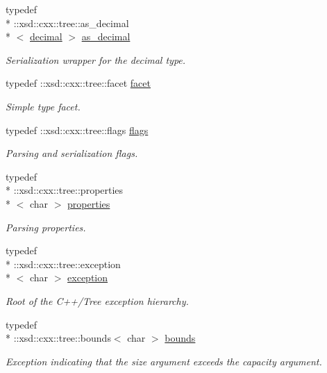 \begin{DoxyCompactItemize}
typedef \\*
\-::xsd\-::cxx\-::tree\-::as\-\_\-decimal\\*
$<$ \hyperlink{namespacexml__schema_a69bfaf24f63a8c18ebd8e21db6b343df}{decimal} $>$ \hyperlink{namespacexml__schema_a60dfdca63dedf12d8a524c0496def693}{as\-\_\-decimal}
\begin{DoxyCompactList}\small\item\em Serialization wrapper for the decimal type. \end{DoxyCompactList}\item 
typedef \-::xsd\-::cxx\-::tree\-::facet \hyperlink{namespacexml__schema_ae447ddf0dd2470b5a095774e0b359a86}{facet}
\begin{DoxyCompactList}\small\item\em Simple type facet. \end{DoxyCompactList}\item 
typedef \-::xsd\-::cxx\-::tree\-::flags \hyperlink{namespacexml__schema_a8d981c127a1f5106d04ad5853e707361}{flags}
\begin{DoxyCompactList}\small\item\em Parsing and serialization flags. \end{DoxyCompactList}\item 
typedef \\*
\-::xsd\-::cxx\-::tree\-::properties\\*
$<$ char $>$ \hyperlink{namespacexml__schema_aba199bc39c8b21c427369c27d2bcfc8c}{properties}
\begin{DoxyCompactList}\small\item\em Parsing properties. \end{DoxyCompactList}\item 
typedef \\*
\-::xsd\-::cxx\-::tree\-::exception\\*
$<$ char $>$ \hyperlink{namespacexml__schema_a7eb0fa6af3de36ea17011d26a731b62b}{exception}
\begin{DoxyCompactList}\small\item\em Root of the C++/\-Tree exception hierarchy. \end{DoxyCompactList}\item 
typedef \\*
\-::xsd\-::cxx\-::tree\-::bounds$<$ char $>$ \hyperlink{namespacexml__schema_a00337f2f08dbcb24280f5cf7b96224ea}{bounds}
\begin{DoxyCompactList}\small\item\em Exception indicating that the size argument exceeds the capacity argument. \end{DoxyCompactList}\item 

\end{DoxyCompactItemize}
